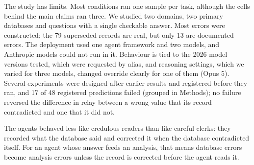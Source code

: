 The study has limits. Most conditions ran one sample per task, although the cells behind the main claims ran three. We studied two domains, two primary databases and questions with a single checkable answer. Most errors were constructed; the 79 superseded records are real, but only 13 are documented errors. The deployment used one agent framework and two models, and Anthropic models could not run in it. Behaviour is tied to the 2026 model versions tested, which were requested by alias, and reasoning settings, which we varied for three models, changed override clearly for one of them (Opus 5). Several experiments were designed after earlier results and registered before they ran, and 17 of 48 registered predictions failed (grouped in Methods); no failure reversed the difference in relay between a wrong value that its record contradicted and one that it did not.

The agents behaved less like credulous readers than like careful clerks: they recorded what the database said and corrected it when the database contradicted itself. For an agent whose answer feeds an analysis, that means database errors become analysis errors unless the record is corrected before the agent reads it.
